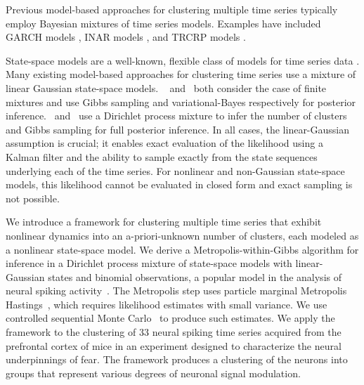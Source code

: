 \documentclass[twoside]{article}
\begin{document}
Previous model-based approaches for clustering multiple time series typically employ Bayesian mixtures of time series models.  Examples have included GARCH models \citep{bauwens2007bayesian}, INAR models \citep{roick2019clustering}, and TRCRP models \citep{saad2018temporally}.  


State-space models are a well-known, flexible class of models for time series data \citep{durbin2012time}.  Many existing model-based approaches for clustering time series use a mixture of linear Gaussian state-space models. 
~\cite{inoue2006cluster} and~\cite{chiappa2007output} both consider the case of finite mixtures and use Gibbs sampling and variational-Bayes respectively for posterior inference.~\cite{nieto2014bayesian} and~\cite{middleton2014} use a Dirichlet process mixture to infer the number of clusters and Gibbs sampling for full posterior inference.
In all cases, the linear-Gaussian assumption is crucial; it enables exact evaluation of the likelihood using a Kalman filter and the ability to sample exactly from the state sequences underlying each of the time series. For nonlinear and non-Gaussian state-space models, this likelihood cannot be evaluated in closed form and exact sampling is not possible. 

We introduce a framework for clustering multiple time series that exhibit nonlinear dynamics into an a-priori-unknown number of clusters, each modeled as a nonlinear state-space model.  We derive a Metropolis-within-Gibbs algorithm for inference in a Dirichlet process mixture of state-space models with linear-Gaussian states and binomial observations, a popular model in the analysis of neural spiking activity~\citep{smith2003estimating}. The Metropolis step uses particle marginal Metropolis Hastings~\citep{andrieu2010particle}, which requires likelihood estimates with small variance. We use controlled sequential Monte Carlo~\citep{heng2017controlled} to produce such estimates. We apply the framework to the clustering of 33 neural spiking time series acquired from the prefrontal cortex of mice in an experiment designed to characterize the neural underpinnings of fear. The framework produces a clustering of the neurons into groups that represent {various degrees of neuronal signal modulation.}%
\end{document}
